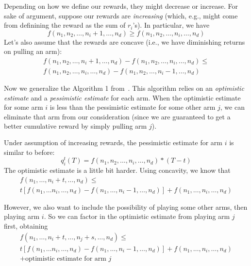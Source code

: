 \documentclass[letterpaper]{article}
\begin{document}
Depending on how we define our rewards, they might decrease or increase. For sake of argument, suppose our rewards are \emph{increasing} (which, e.g., might come from definining the reward as the sum of $r_i$'s). In particular, we have
\begin{equation}
    f(n_1, n_2, \ldots, n_i + 1, \ldots, n_d) \geq f(n_1, n_2, \ldots, n_i, \ldots, n_d)
\end{equation}
Let's also assume that the rewards are concave (i.e., we have diminishing returns on pulling an arm):
\begin{align}
    f(n_1, n_2, \ldots, n_i + 1, \ldots, n_d) -f(n_1, n_2, \ldots, n_i, \ldots, n_d) \leq \\
    f(n_1, n_2, \ldots, n_i, \ldots, n_d) -f(n_1, n_2, \ldots, n_i-1, \ldots, n_d)
\end{align}

Now we generalize the Algorithm 1 from~\cite{heidari2016tight_policy_regret}. This algorithm relies on an \emph{optimistic estimate} and a \emph{pessimistic estimate} for each arm. When the optimistic estimate for some arm $i$ is less than the pessimistic estimate for some other arm $j$, we can eliminate that arm from our consideration (since we are guaranteed to get a better cumulative reward by simply pulling arm $j$).

Under assumption of increasing rewards, the pessimistic estimate for arm $i$ is similar to before:
\begin{equation}
    q_i^t(T) = f(n_1, n_2, \ldots, n_i, \ldots, n_d) * (T - t)
\end{equation}
The optimistic estimate is a little bit harder. Using concavity, we know that 
\begin{align}
    f(n_1, \ldots, n_i + t, \ldots, n_d) \leq \\t \left[f(n_1,\ldots n_i,\ldots, n_d) - f(n_1,\ldots, n_i-1,\ldots, n_d)\right] + f(n_1,\ldots,n_i,\ldots,n_d)
\end{align}

However, we also want to include the possibility of playing some other arms, then playing arm $i$. So we can factor in the optimistic estimate from playing arm $j$ first, obtaining
\begin{align}
    f(n_1, \ldots, n_i + t, \ldots, n_j+s, \ldots, n_d) \leq \\t \left[f(n_1,\ldots n_i,\ldots, n_d) - f(n_1,\ldots, n_i-1,\ldots, n_d)\right]
     + f(n_1,\ldots,n_i,\ldots,n_d) \\
     + \text{optimistic estimate for arm $j$}
\end{align}
\end{document}
